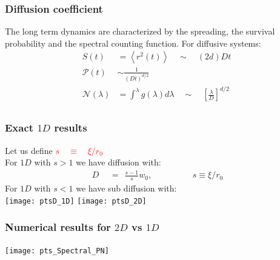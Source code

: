 \documentclass{beamer}
\begin{document}
\begin{frame}
\frametitle{Diffusion coefficient}
The long term dynamics are characterized by the spreading, the survival probability and the spectral counting function. For diffusive systems:\vspace{16pt}
\begin{align*}
 S(t) &= \left\langle r^2(t)\right\rangle \quad\sim\quad  (2d)Dt\ \\
 \mathcal{P}(t) &\sim  \frac{1}{\left({D t}\right)^{d/2}}        \\
 \mathcal{N}(\lambda)  &= \int^\lambda g(\lambda)d\lambda  \quad\sim\quad \left[\frac{\lambda}{D}\right]^{d/2} \\
\end{align*}
%
\end{frame}
\begin{frame}
\frametitle{Exact $1D$ results}
Let us define \textcolor{red}{$s\quad \equiv \quad \xi/r_0$}\\
For $1D$ with $s > 1$ we have diffusion with:
\begin{align*}
D \ \ &=\ \  \frac{s -1 }{s} w_0, 
\hspace{2cm} s \equiv \xi/r_0
\end{align*}
For $1D$ with $s < 1$ we have sub diffusion with:  \\ \vspace{8pt}
%
%
\texttt{[image: ptsD\_1D]}
\texttt{[image: ptsD\_2D]}

\end{frame}

\begin{frame}
\frametitle{Numerical results for $2D$ vs $1D$}

\texttt{[image: pts\_Spectral\_PN]}
\end{frame}
\end{document}
